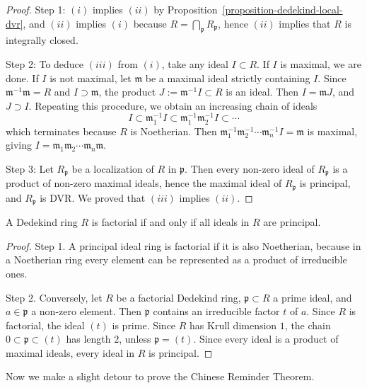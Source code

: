 \begin{proof}
Step 1: $(i)$ implies $(ii)$ by
Proposition~\ref{proposition-dedekind-local-dvr},
and $(ii)$ implies $(i)$ because
$R=\bigcap_{\mathfrak{p}}R_{\mathfrak{p}}$,
hence $(ii)$ implies that $R$ is
integrally closed.

Step 2: To deduce $(iii)$ from $(i)$, take
any ideal $I\subset R$. If $I$ is maximal,
we are done. If $I$ is not maximal, let
$\mathfrak{m}$ be a maximal ideal strictly
containing $I$. Since
$\mathfrak{m}^{-1}\mathfrak{m}=R$ and
$I\supset \mathfrak{m}$, the product
$J:=\mathfrak{m}^{-1}I\subset R$ is an
ideal. Then $I=\mathfrak{m}J$, and
$J\supset I$. Repeating this procedure,
we obtain an increasing chain of ideals
$$
I\subset \mathfrak{m}_1^{-1}I
\subset \mathfrak{m}_1^{-1}\mathfrak{m}_2^{-1}I
\subset \cdots
$$
which terminates because $R$ is
Noetherian. Then
$\mathfrak{m}_1^{-1}\mathfrak{m}_2^{-1}
\cdots \mathfrak{m}_n^{-1}I=\mathfrak{m}$
is maximal, giving
$I=\mathfrak{m}_1\mathfrak{m}_2\cdots
\mathfrak{m}_n\mathfrak{m}$.

Step 3: Let $R_{\mathfrak{p}}$ be a
localization of $R$ in $\mathfrak{p}$.
Then every non-zero ideal of
$R_{\mathfrak{p}}$ is a product of
non-zero maximal ideals, hence the
maximal ideal of $R_{\mathfrak{p}}$ is
principal, and $R_{\mathfrak{p}}$ is DVR.
We proved that $(iii)$ implies $(ii)$.
\end{proof}

\begin{corollary}
\label{lemma-dedekind-factorial-iff-principal}
A Dedekind ring $R$ is factorial if and
only if all ideals in $R$ are principal.
\end{corollary}

\begin{proof}
Step 1. A principal ideal ring is
factorial if it is also Noetherian,
because in a Noetherian ring every
element can be represented as a product
of irreducible ones.

Step 2. Conversely, let $R$ be a
factorial Dedekind ring,
$\mathfrak{p}\subset R$ a prime ideal,
and $a\in \mathfrak{p}$ a non-zero
element.
Then $\mathfrak{p}$ contains an
irreducible factor $t$ of $a$.
Since $R$ is factorial, the ideal $(t)$
is prime.
Since $R$ has Krull dimension $1$, the
chain
$0\subset \mathfrak{p}\subset (t)$
has length $2$, unless
$\mathfrak{p}=(t)$.
Since every ideal is a product of
maximal ideals, every ideal in $R$ is
principal.
\end{proof}

\medskip\noindent
Now we make a slight detour to prove the
Chinese Reminder Theorem.

